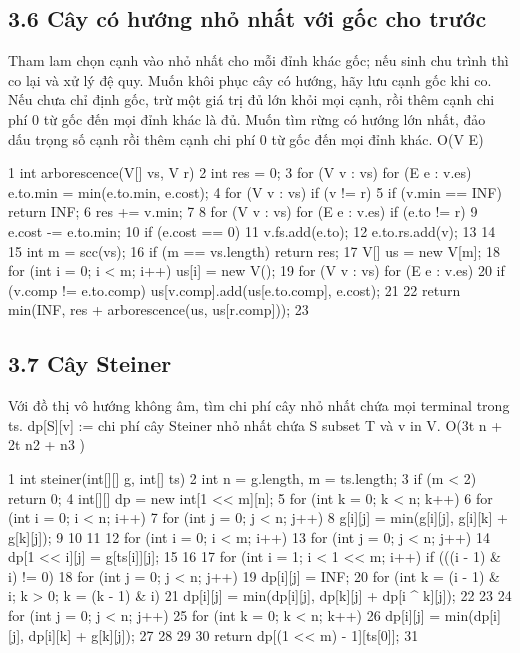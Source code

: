 \documentclass[11pt]{article}
\begin{document}
\subsection{3.6 Cây có hướng nhỏ nhất với gốc cho trước}
\begin{NoteBlock}
Tham lam chọn cạnh vào nhỏ nhất cho mỗi đỉnh khác gốc; nếu sinh chu trình thì co lại và xử lý đệ quy.
Muốn khôi phục cây có hướng, hãy lưu cạnh gốc khi co.
Nếu chưa chỉ định gốc, trừ một giá trị đủ lớn khỏi mọi cạnh, rồi thêm cạnh chi phí 0 từ gốc đến mọi đỉnh khác
là đủ.
Muốn tìm rừng có hướng lớn nhất, đảo dấu trọng số cạnh rồi thêm cạnh chi phí 0 từ gốc đến mọi đỉnh khác.
O(V E)
\end{NoteBlock}
\begin{Code}
1 int arborescence(V[] vs, V r) {
2 int res = 0;
3 for (V v : vs) for (E e : v.es) e.to.min = min(e.to.min, e.cost);
4 for (V v : vs) if (v != r) {
5 if (v.min == INF) return INF;
6 res += v.min;
7 }
8 for (V v : vs) for (E e : v.es) if (e.to != r) {
9 e.cost -= e.to.min;
10 if (e.cost == 0) {
11 v.fs.add(e.to);
12 e.to.rs.add(v);
13 }
14 }
15 int m = scc(vs);
16 if (m == vs.length) return res;
17 V[] us = new V[m];
18 for (int i = 0; i < m; i++) us[i] = new V();
19 for (V v : vs) for (E e : v.es) {
20 if (v.comp != e.to.comp) us[v.comp].add(us[e.to.comp], e.cost);
21 }
22 return min(INF, res + arborescence(us, us[r.comp]));
23 }
\end{Code}
\subsection{3.7 Cây Steiner}
\begin{NoteBlock}
Với đồ thị vô hướng không âm, tìm chi phí cây nhỏ nhất chứa mọi terminal trong ts.
dp[S][v] := chi phí cây Steiner nhỏ nhất chứa S subset T và v in V.
O(3t
n + 2t
n2
+ n3
)
\end{NoteBlock}
\begin{Code}
1 int steiner(int[][] g, int[] ts) {
2 int n = g.length, m = ts.length;
3 if (m < 2) return 0;
4 int[][] dp = new int[1 << m][n];
5 for (int k = 0; k < n; k++) {
6 for (int i = 0; i < n; i++) {
7 for (int j = 0; j < n; j++) {
8 g[i][j] = min(g[i][j], g[i][k] + g[k][j]);
9 }
10 }
11 }
12 for (int i = 0; i < m; i++) {
13 for (int j = 0; j < n; j++) {
14 dp[1 << i][j] = g[ts[i]][j];
15 }
16 }
17 for (int i = 1; i < 1 << m; i++) if (((i - 1) & i) != 0) {
18 for (int j = 0; j < n; j++) {
19 dp[i][j] = INF;
20 for (int k = (i - 1) & i; k > 0; k = (k - 1) & i) {
21 dp[i][j] = min(dp[i][j], dp[k][j] + dp[i ^ k][j]);
22 }
23 }
24 for (int j = 0; j < n; j++) {
25 for (int k = 0; k < n; k++) {
26 dp[i][j] = min(dp[i][j], dp[i][k] + g[k][j]);
27 }
28 }
29 }
30 return dp[(1 << m) - 1][ts[0]];
31 }
\end{Code}
\end{document}
